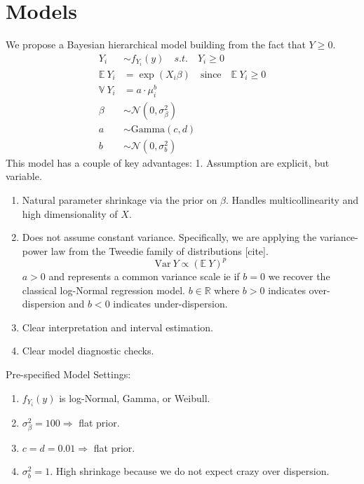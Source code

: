 \documentclass[
  letterpaper,
]{article}
\begin{document}
\section{Models}\label{models}

We propose a Bayesian hierarchical model building from the fact that
\(Y \geq 0\). \begin{equation}
\begin{aligned} 
    Y_i &\sim f_{Y_i}(y) \quad s.t. \quad Y_i \geq 0 \\ 
    \mathbb{E} \ Y_i &= \exp(X_i \beta) 
        \quad \text{since} \quad \mathbb{E} \ Y_i \geq 0 \\ 
    \mathbb{V} \ Y_i &= a \cdot \mu_i^b \\
    \beta &\sim \mathcal{N}(0, \sigma^2_\beta) \\
    a &\sim \text{Gamma}(c, d) \\ 
    b &\sim \mathcal{N}(0, \sigma^2_b)
\end{aligned}
\end{equation} This model has a couple of key advantages: 1. Assumption
are explicit, but variable.

\begin{enumerate}
\def\labelenumi{\arabic{enumi}.}
\item
  Natural parameter shrinkage via the prior on \(\beta\). Handles
  multicollinearity and high dimensionality of \(X\).
\item
  Does not assume constant variance. Specifically, we are applying the
  variance-power law from the Tweedie family of distributions
  {[}cite{]}. \begin{equation}
   \text{Var} \ Y \propto (\mathbb{E} \ Y)^p 
  \end{equation} \(a > 0\) and represents a common variance scale ie if
  \(b = 0\) we recover the classical log-Normal regression model.
  \(b \in \mathbb{R}\) where \(b > 0\) indicates over-dispersion and
  \(b < 0\) indicates under-dispersion.
\item
  Clear interpretation and interval estimation.
\item
  Clear model diagnostic checks.
\end{enumerate}

Pre-specified Model Settings:

\begin{enumerate}
\def\labelenumi{\arabic{enumi}.}
\item
  \(f_{Y_i}(y)\) is log-Normal, Gamma, or Weibull.
\item
  \(\sigma^2_\beta=100 \Rightarrow\) flat prior.
\item
  \(c = d = 0.01 \Rightarrow\) flat prior.
\item
  \(\sigma^2_b = 1\). High shrinkage because we do not expect crazy over
  dispersion.
\end{enumerate}
\end{document}
